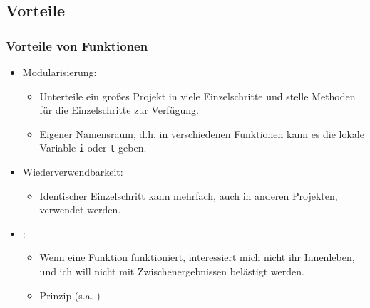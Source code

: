   \subsection{Vorteile}
  \begin{frame}
      \frametitle{Vorteile von Funktionen}
      \begin{itemize}
        \item Modularisierung:
        \begin{itemize}
          \item Unterteile ein großes Projekt in viele Einzelschritte und stelle Methoden für die Einzelschritte zur Verfügung.
          \item Eigener Namensraum, d.h. in verschiedenen Funktionen kann es die lokale Variable \texttt{i} oder \texttt{t} geben.
        \end{itemize}
        \item Wiederverwendbarkeit:
        \begin{itemize}
          \item Identischer Einzelschritt kann mehrfach, auch in anderen Projekten, verwendet werden.
        \end{itemize}
        \item {}:
        \begin{itemize}
          \item Wenn eine Funktion funktioniert, interessiert mich nicht ihr Innenleben, und ich will nicht mit Zwischenergebnissen belästigt werden.
          \item {} Prinzip (s.a. )
        \end{itemize}
      \end{itemize}
  \end{frame}

